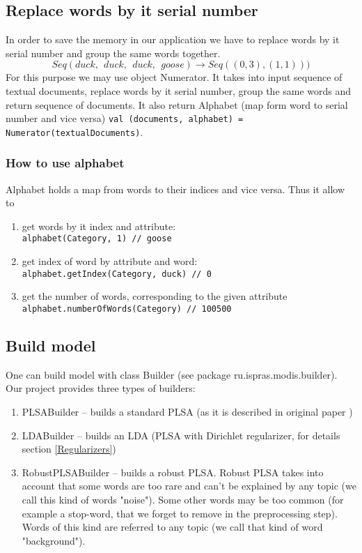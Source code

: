 \subsection*{Replace words by it serial number}
    In order to save the memory in our application we have to replace words by it serial number and group the same words together.
    $$ Seq(duck, \ \ duck, \ \ duck, \ \ goose) \to Seq((0, 3), (1, 1))) $$
    For this purpose we may use object Numerator. It takes into input sequence of textual documents, replace words by it serial number,
    group the same words and return sequence of documents. It also return Alphabet (map form word to serial number and vice versa)
    \texttt{val (documents, alphabet) = Numerator(textualDocuments)}.\\ 
    \subsubsection*{How to use alphabet}
	Alphabet holds a map from words to their indices and vice versa. Thus it allow to
	\begin{enumerate}
	    \item get words by it index and attribute:\\
		\texttt{alphabet(Category, 1) // goose}
	    \item get index of word by attribute and word: \\
		\texttt{alphabet.getIndex(Category, duck) // 0}
	    \item get the number of words, corresponding to the given attribute \\
		\texttt{alphabet.numberOfWords(Category) // 100500}
	\end{enumerate}
	
\subsection*{Build model}
    One can build model with class Builder (see package ru.ispras.modis.builder). Our project provides three types of builders:
    \begin{enumerate}
	\item PLSABuilder \--- builds a standard PLSA (as it is described in original paper \cite{PLSA_original})
	\item LDABuilder  \--- builds an LDA (PLSA with Dirichlet regularizer, for details section \ref{Regularizers})
	\item RobustPLSABuilder \--- builds a robust PLSA. Robust PLSA takes into account that some words are too rare and can't be explained by any topic 
	    (we call this kind of words "noise"). Some other words may be too common (for example a stop\--word, that we forget to remove in the preprocessing step). Words of this kind
	    are referred to any topic (we call that kind of word "background").  
    \end{enumerate}

